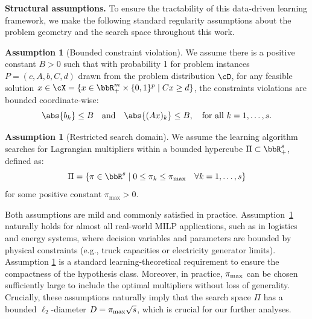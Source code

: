 \documentclass{article}
\theoremstyle{plain}
\theoremstyle{definition}
\newtheorem{assumption}[theorem]{Assumption}
\theoremstyle{remark}
\begin{document}
\textbf{Structural assumptions.} To ensure the tractability of this data-driven learning framework, we make the following standard regularity assumptions about the problem geometry and the search space throughout this work.

\begin{assumption}[Bounded constraint violation] \label{asmp:bounded-constaint-violation}
     We assume there is a positive constant $B > 0$ such that with probability 1 for  problem instances $P = (c, A, b, C, d)$ drawn from the problem distribution $\cD$, for any feasible solution $x \in \cX = \{x \in \bbR^{m}_+ \times \{0, 1\}^p \mid Cx \geq d\}$, the constraints violations are bounded coordinate-wise:
     \[
        \abs{b_k} \leq B \quad \textup{and} \quad \abs{(Ax)_k} \leq B, \quad \textup{for all }k = 1, \dots, s. 
     \]
\end{assumption}

\begin{assumption}[Restricted search domain] \label{asmp:restricted-search-main}
    We assume the learning algorithm searches for Lagrangian multipliers within a bounded hypercube $\Pi \subset \bbR^s_{+}$, defined as: 
    \[
        \Pi = \{\pi \in \bbR^s \mid 0 \leq \pi_k \leq \pi_{\max} \quad \forall k = 1, \dots, s\}
    \]
    for some positive constant $\pi_{\max} > 0$.
\end{assumption}

Both assumptions are mild and commonly satisfied in practice. Assumption~\ref{asmp:bounded-constaint-violation} naturally holds for almost all real-world MILP applications, such as in logistics and energy systems, where decision variables and parameters are bounded by physical constraints (e.g., truck capacities or electricity generator limits). Assumption \ref{asmp:restricted-search-main} is a standard learning-theoretical requirement to ensure the compactness of the hypothesis class. Moreover, in practice, $\pi_\textup{max}$ can be chosen sufficiently large to include the optimal multipliers without loss of generality. Crucially, these assumptions naturally imply that the search space $\Pi$ has a bounded $\ell_2$-diameter $D = \pi_\textup{max}\sqrt{s}$, which is crucial for our further analyses. 
\end{document}
